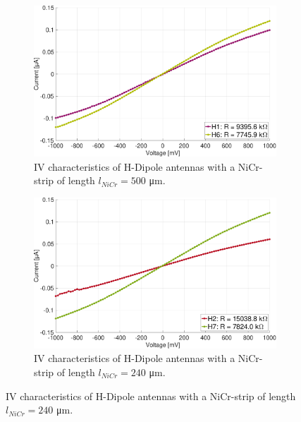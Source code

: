 \begin{figure}[ht]
    \centering

    \begin{subfigure}[b]{0.49\textwidth}
        \centering
        \includegraphics[width=\textwidth]{figures/IV_v2/IV_H1_H6.pdf}
        \caption{IV characteristics of H-Dipole antennas with a NiCr-strip of length $l_{NiCr} = 500$ \si{\micro \meter}.}
        \label{fig:sub1}
    \end{subfigure}
    \hfill
    \begin{subfigure}[b]{0.49\textwidth}
        \centering
        \includegraphics[width=\textwidth]{figures/IV_v2/IV_H2_H7.pdf}
        \caption{IV characteristics of H-Dipole antennas with a NiCr-strip of length $l_{NiCr} = 240$ \si{\micro \meter}.}
        \label{fig:sub2}
    \end{subfigure}
    
    \vspace{1em} %


\end{figure}
